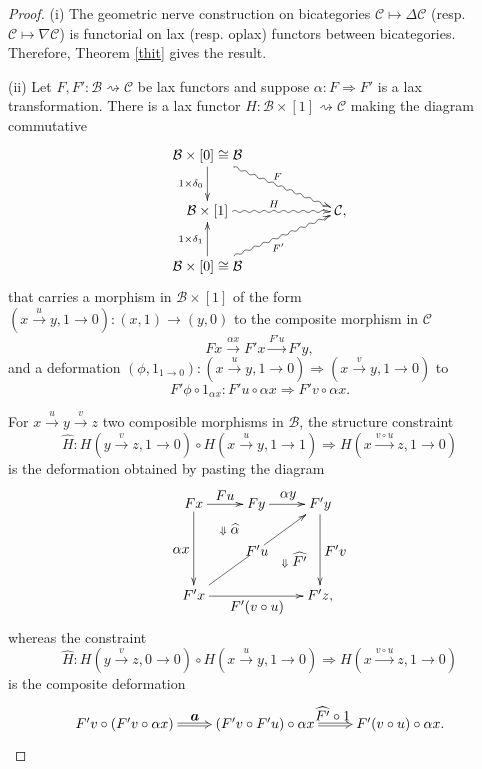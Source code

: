 \documentclass[]{amsart}
\begin{document}
\begin{proof} (i) The geometric nerve construction on bicategories ${\ensuremath{\mathcal{C}}}\mapsto {\ensuremath{\Delta}}{\ensuremath{\mathcal{C}}}$ (resp. ${\ensuremath{\mathcal{C}}}\mapsto \nabla{\ensuremath{\mathcal{C}}}$) is functorial on lax (resp. oplax) functors between bicategories. Therefore, Theorem \ref{thit} gives the result.

(ii) Let $F,F':{\ensuremath{\mathcal{B}}}\rightsquigarrow{\ensuremath{\mathcal{C}}}$ be lax functors and suppose $\alpha:F\Rightarrow F'$ is a lax
transformation. There is a lax functor $H:{\ensuremath{\mathcal{B}}}\times [1]\rightsquigarrow {\ensuremath{\mathcal{C}}}$ making  the diagram
commutative
\begin{equation}\label{homo}
\xymatrix@C=60pt{{\ensuremath{\mathcal{B}}}\times [0]\cong {\ensuremath{\mathcal{B}}} \ar[d]_{1\times\delta_0}\ar@{~>}[dr]^{F}& \\ {\ensuremath{\mathcal{B}}}\times[1]\ar@{~>}[r]^H&{\ensuremath{\mathcal{C}}},\\
{\ensuremath{\mathcal{B}}}\times [0]\cong {\ensuremath{\mathcal{B}}}\ar@{~>}[ru]_{F'}\ar[u]^{1\times \delta_1}&}
\end{equation}
that carries a morphism in ${\ensuremath{\mathcal{B}}}\times[1]$ of the form $(x\overset{u}\to y,1\to 0):(x,1)\to (y,0)$ to
the composite morphism in ${\ensuremath{\mathcal{C}}}$
$$Fx\overset{\textstyle \alpha x}\longrightarrow F'x\overset{\textstyle F'u}\longrightarrow  F'y,$$
and a deformation $(\phi,1_{1\to 0}):(x\overset{u}\to y,1\to 0)\Rightarrow (x\overset{v}\to y,1\to
0)$ to
$$ F'\phi\circ 1_{\alpha x}:
 F'u\circ \alpha x\Rightarrow  F'v\circ\alpha x.$$

For $x\overset{u}\to y\overset{v}\to z$ two composible morphisms in ${\ensuremath{\mathcal{B}}}$,  the structure constraint
$$\widehat{H}:H(y\overset{v}\to z,1\to 0)\circ H(x\overset{u}\to y,1\to 1)\Rightarrow H(x\overset{v\circ u}\longrightarrow z,1\to 0)$$
is the deformation obtained by pasting the diagram
$$
\xymatrix@R=50pt{Fx\ar@{}[rd]^<<<<<<<<{\Downarrow\textstyle{
\widehat{\alpha}}}\ar[r]^{\textstyle{Fu}}\ar[d]_{\textstyle{ \alpha x}}&Fy\ar[r]^{\textstyle{
\alpha y}}&F'y\ar[d]^{\textstyle{ F'v}}\\F'x\ar[rru]|{\textstyle {F'u}}\ar[rr]_{\textstyle
F'(v\circ u)}&&F'z,\ar@{}[lu]|>>>>>>>>>>>>>>{\Downarrow\textstyle{ \widehat{F'}}}}
$$
whereas the constraint
$$\widehat{H}:H(y\overset{v}\to z,0\to 0)\circ H(x\overset{u}\to y,1\to 0)\Rightarrow H(x\overset{v\circ u}\longrightarrow  z,1\to 0)$$
is the composite deformation
$$
\xymatrix{ F'v\circ ( F'v \circ \alpha x)\ar@{=>}[r]^{\textstyle\boldsymbol{a}}&(F'v\circ F'u)\circ
\alpha x\ar@{=>}[r]^{\textstyle\widehat{F'}\circ 1}&  F'(v\circ u)\circ \alpha x.}
$$


\end{proof}
\end{document}
